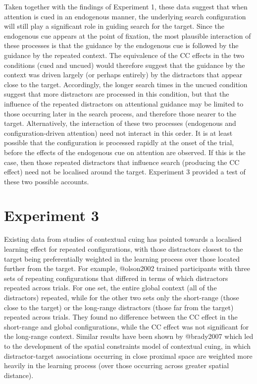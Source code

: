 \documentclass[
  man,
  floatsintext,
  longtable,
  nolmodern,
  notxfonts,
  notimes,
  colorlinks=true,linkcolor=blue,citecolor=blue,urlcolor=blue]{apa7}
\begin{document}
Taken together with the findings of Experiment 1, these data suggest
that when attention is cued in an endogenous manner, the underlying
search configuration will still play a significant role in guiding
search for the target. Since the endogenous cue appears at the point of
fixation, the most plausible interaction of these processes is that the
guidance by the endogenous cue is followed by the guidance by the
repeated context. The equivalence of the CC effects in the two
conditions (cued and uncued) would therefore suggest that the guidance
by the context was driven largely (or perhaps entirely) by the
distractors that appear close to the target. Accordingly, the longer
search times in the uncued condition suggest that more distractors are
processed in this condition, but that the influence of the repeated
distractors on attentional guidance may be limited to those occurring
later in the search process, and therefore those nearer to the target.
Alternatively, the interaction of these two processes (endogenous and
configuration-driven attention) need not interact in this order. It is
at least possible that the configuration is processed rapidly at the
onset of the trial, before the effects of the endogenous cue on
attention are observed. If this is the case, then those repeated
distractors that influence search (producing the CC effect) need not be
localised around the target. Experiment 3 provided a test of these two
possible accounts.

\section{Experiment 3}\label{experiment-3}

Existing data from studies of contextual cuing has pointed towards a
localised learning effect for repeated configurations, with those
distractors closest to the target being preferentially weighted in the
learning process over those located further from the target. For
example, @olson2002 trained participants with three sets of repeating
configurations that differed in terms of which distractors repeated
across trials. For one set, the entire global context (all of the
distractors) repeated, while for the other two sets only the short-range
(those close to the target) or the long-range distractors (those far
from the target) repeated across trials. They found no difference
between the CC effect in the short-range and global configurations,
while the CC effect was not significant for the long-range context.
Similar results have been shown by @brady2007 which led to the
development of the spatial constraints model of contextual cuing, in
which distractor-target associations occurring in close proximal space
are weighted more heavily in the learning process (over those occurring
across greater spatial distance).
\end{document}
